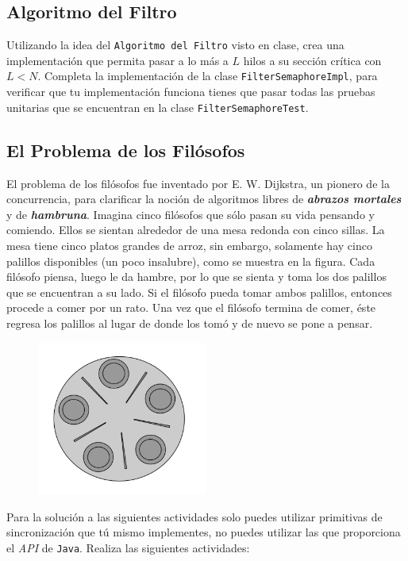 \documentclass[a4paper,11pt]{article}
\newcommand{\nemph}[1] { \textbf{\emph{#1}}}
\begin{document}
	\subsection{Algoritmo del Filtro}
	Utilizando la idea del \verb|Algoritmo del Filtro| visto en clase, crea una implementación que permita pasar a lo más a \( L \) hilos a su sección crítica con \(L < N\).  Completa la implementación de la clase \verb|FilterSemaphoreImpl|, para verificar que tu implementación funciona tienes que pasar todas las pruebas unitarias que se encuentran en la clase \verb|FilterSemaphoreTest|.

    \subsection{El Problema de los Filósofos}
    El problema de los filósofos fue inventado por E. W. Dijkstra, un pionero de la concurrencia, para clarificar la noción de algoritmos libres de \nemph{abrazos mortales} y de \nemph{hambruna}. Imagina cinco filósofos que sólo pasan su vida pensando y comiendo. Ellos se sientan alrededor de una mesa redonda con cinco sillas. La mesa tiene cinco platos grandes de arroz, sin embargo, solamente hay cinco palillos disponibles (un poco insalubre), como se muestra en la figura. Cada filósofo piensa, luego le da hambre, por lo que se sienta y toma los dos palillos que se encuentran a su lado. Si el filósofo pueda tomar ambos palillos, entonces procede a comer por un rato. Una vez que el filósofo termina de comer, éste regresa los palillos al lugar de donde los tomó y de nuevo se pone a pensar.\\
    
    \begin{figure}[!ht]
		\centering
		\includegraphics[width=0.5\textwidth]{./imgs/dining-table.png}
	\end{figure}
    
    Para la solución a las siguientes actividades solo puedes utilizar primitivas de sincronización que tú mismo implementes, no puedes utilizar las que proporciona el \emph{API} de \verb|Java|. Realiza las siguientes actividades:
    
\end{document}
